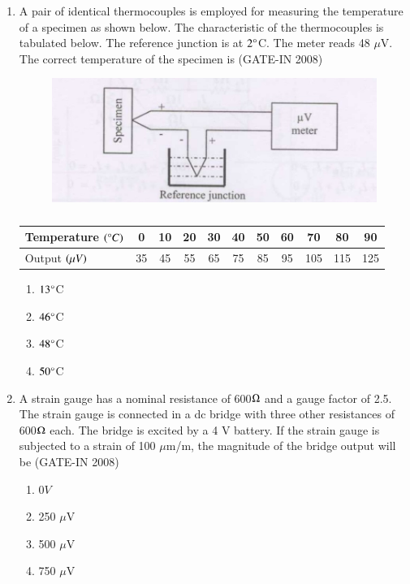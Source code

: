 \documentclass[journal,12pt,onecolumn]{IEEEtran}
\theoremstyle{remark}
\begin{document}
\begin{enumerate}
    \item A pair of identical thermocouples is employed for measuring the temperature of a specimen as shown below.  The characteristic of the thermocouples is tabulated below. The reference junction is at $2\degree$C. The meter reads 48 $\mu$V. The correct temperature of the specimen is \hfill{(GATE-IN 2008)}
    
\begin{figure}[H]
    \centering
    \includegraphics[width=0.5\columnwidth]{figs/i17.jpg}
    \caption{}
    \label{fig:placeholder17}
\end{figure}





\begin{table}[h]
\centering
\begin{tabular}{|l|c|c|c|c|c|c|c|c|c|c|}
\hline
Temperature $\left(\degree C\right)$ & 0 & 10 & 20 & 30 & 40 & 50 & 60 & 70 & 80 & 90 \\
\hline
Output $\left(\mu V\right)$ & 35 & 45 & 55 & 65 & 75 & 85 & 95 & 105 & 115 & 125 \\
\hline
\end{tabular}
\caption{}
\label{Table}
\end{table}








\begin{multicols}{4}
    \begin{enumerate} 
        \item  $13\degree$C
        \item  $46\degree$C
        \item  $48\degree$C
        \item  $50\degree$C
    \end{enumerate}
    \end{multicols}
    
    \item A strain gauge has a nominal resistance of 600$\ohm$ and a gauge factor of 2.5. The strain gauge is
connected in a dc bridge with three other resistances of 600$\ohm$ each. The bridge is excited by a 4 V
battery. If the strain gauge is subjected to a strain of 100 $\mu$m/m, the magnitude of the bridge output will be \hfill{(GATE-IN 2008)}
\begin{multicols}{4}
    \begin{enumerate} 
        \item  $0 V$
        \item  250 $\mu$V
        \item  500 $\mu$V
        \item  750 $\mu$V
    \end{enumerate}
    \end{multicols}
    

\end{enumerate}
\end{document}
